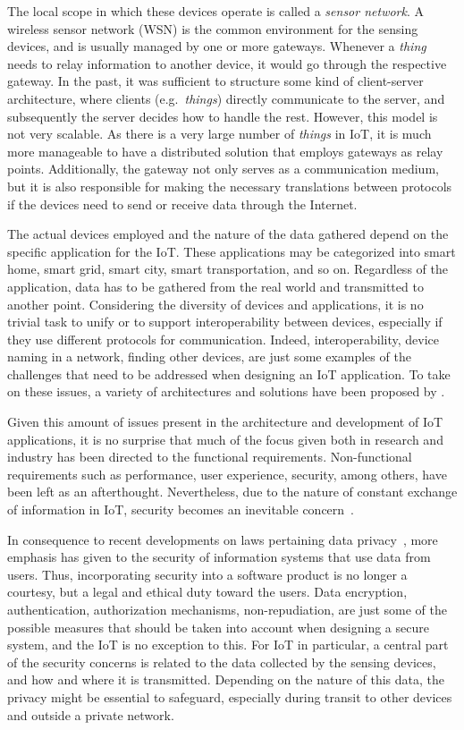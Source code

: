 \documentclass[12pt]{article}
\begin{document}
The local scope in which these devices operate is called a \emph{sensor network}. A wireless sensor network (WSN) is the common environment for the sensing devices, and is usually managed by one or more gateways. Whenever a \emph{thing} needs to relay information to another device, it would go through the respective gateway. In the past, it was sufficient to structure some kind of client-server architecture, where clients (e.g.\ \emph{things}) directly communicate to the server, and subsequently the server decides how to handle the rest. However, this model is not very scalable. As there is a very large number of \emph{things} in IoT, it is much more manageable to have a distributed solution that employs gateways as relay points. Additionally, the gateway not only serves as a communication medium, but it is also responsible for making the necessary translations between protocols if the devices need to send or receive data through the Internet.

The actual devices employed and the nature of the data gathered depend on the specific application for the IoT. These applications may be categorized into smart home, smart grid, smart city, smart transportation, and so on. Regardless of the application, data has to be gathered from the real world and transmitted to another point. Considering the diversity of devices and applications, it is no trivial task to unify or to support interoperability between devices, especially if they use different protocols for communication. Indeed, interoperability, device naming in a network, finding other devices, are just some examples of the challenges that need to be addressed when designing an IoT application. To take on these issues, a variety of architectures and solutions have been proposed by \citet{ALABA201710}. 

Given this amount of issues present in the architecture and development of IoT applications, it is no surprise that much of the focus given both in research and industry has been directed to the functional requirements. Non-functional requirements such as performance, user experience, security, among others, have been left as an afterthought. Nevertheless, due to the nature of constant exchange of information in IoT, security becomes an inevitable concern~\cite{Zhang:2015}.

In consequence to recent developments on laws pertaining data privacy~\cite{eu_law}, more emphasis has given to the security of information systems that use data from users. Thus, incorporating security into a software product is no longer a courtesy, but a legal and ethical duty toward the users. Data encryption, authentication, authorization mechanisms, non-repudiation, are just some of the possible measures that should be taken into account when designing a secure system, and the IoT is no exception to this. For IoT in particular, a central part of the security concerns is related to the data collected by the sensing devices, and how and where it is transmitted. Depending on the nature of this data, the privacy might be essential to safeguard, especially during transit to other devices and outside a private network.
\end{document}
